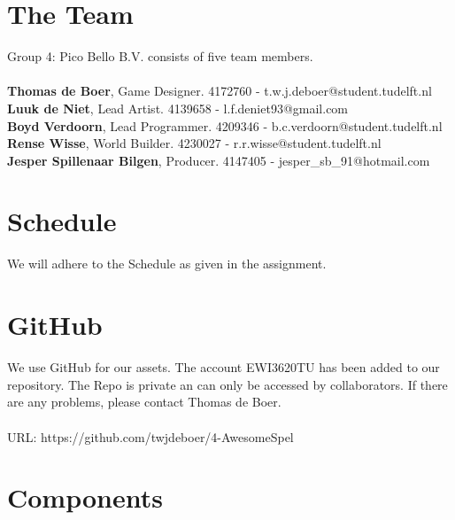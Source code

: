 \documentclass{article}
\begin{document}
	\section{The Team}
		Group 4: Pico Bello B.V. consists of five team members.\\
		\\
		\textbf{Thomas de Boer}, Game Designer. 4172760 - t.w.j.deboer@student.tudelft.nl\\
		\textbf{Luuk de Niet}, Lead Artist. 4139658 - l.f.deniet93@gmail.com\\
		\textbf{Boyd Verdoorn}, Lead Programmer. 4209346 - b.c.verdoorn@student.tudelft.nl\\
		\textbf{Rense Wisse}, World Builder. 4230027 - r.r.wisse@student.tudelft.nl\\
		\textbf{Jesper Spillenaar Bilgen}, Producer. 4147405 - jesper\_sb\_91@hotmail.com

	\section{Schedule}
		We will adhere to the Schedule as given in the assignment.

	\section{GitHub}
		We use GitHub for our assets. The account EWI3620TU has been added to our repository. The Repo is private an can only be accessed by collaborators. If there are any problems, please contact Thomas de Boer. \\
		\\
		URL: https://github.com/twjdeboer/4-AwesomeSpel

	\newpage
	\section{Components}
\end{document}
